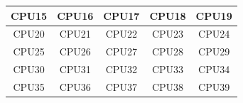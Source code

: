 \documentclass[IN,11pt,twoside,openright,master,english]{tumthesis}
\begin{document}
\begin{figure}[h]
{{\begin{tabular}[htp]{|c|c|c|c|c|}
			\cellcolor{TUMBlue!0} CPU15 & \cellcolor{TUMBlue!0} CPU16 & \cellcolor{TUMBlue!0} CPU17 & \cellcolor{TUMBlue!0} CPU18 & \cellcolor{TUMBlue!0} CPU19 \\
			\hline
			\cellcolor{TUMBlue!0} CPU20 & \cellcolor{TUMBlue!0} CPU21 & \cellcolor{TUMBlue!0} CPU22 & \cellcolor{TUMBlue!0} CPU23 & \cellcolor{TUMBlue!0} CPU24 \\
			\hline
			\cellcolor{TUMBlue!0} CPU25 & \cellcolor{TUMBlue!93} CPU26 & \cellcolor{TUMBlue!0} CPU27 & \cellcolor{TUMBlue!0} CPU28 & \cellcolor{TUMBlue!0} CPU29 \\
			\hline
			\cellcolor{TUMBlue!0} CPU30 & \cellcolor{TUMBlue!0} CPU31 & \cellcolor{TUMBlue!93} CPU32 & \cellcolor{TUMBlue!0} CPU33 & \cellcolor{TUMBlue!0} CPU34 \\
			\hline
			\cellcolor{TUMBlue!0} CPU35 & \cellcolor{TUMBlue!93} CPU36 & \cellcolor{TUMBlue!0} CPU37 & \cellcolor{TUMBlue!0} CPU38 & \cellcolor{TUMBlue!0} CPU39 \\
			\hline
		\end{tabular}
		}
	}


\end{figure}
\end{document}
